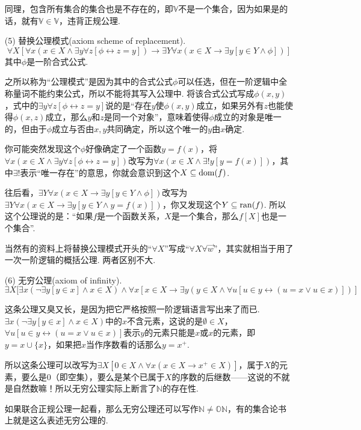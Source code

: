 \documentclass[main.tex]{subfiles}
\begin{document}
\begin{itemize}
\begin{note}
        同理，包含所有集合的集合也是不存在的，即\(\mathbb{V}\)不是一个集合，因为如果是的话，就有\(\mathbb{V}\in\mathbb{V}\)，违背正规公理.
    \end{note}
    
    \item[(5)] 替换公理模式(axiom scheme of replacement).
    \[\forall X [\forall x(x \in X \wedge \exists y \forall z[\phi \leftrightarrow z=y]) \rightarrow \exists Y \forall x(x \in X \rightarrow \exists y[y \in Y \wedge \phi])]\]
    其中\(\phi\)是一阶合式公式.
    \begin{note}
        之所以称为“公理模式”是因为其中的合式公式\(\phi\)可以任选，但在一阶逻辑中全称量词不能约束公式，所以不能将其写入公理中. 将该合式公式写成\(\phi(x,y)\)，式中的\(\exists y \forall z[\phi \leftrightarrow z=y]\)说的是“存在\(y\)使\(\phi(x,y)\)成立，如果另外有\(z\)也能使得\(\phi(x,z)\)成立，那么\(y\)和\(z\)是同一个对象”，意味着使得\(\phi\)成立的对象是唯一的，但由于\(\phi\)成立与否由\(x,y\)共同确定，所以这个唯一的\(y\)由\(x\)确定. 

        你可能突然发现这个\(\phi\)好像确定了一个函数\(y=f(x)\)，将\(\forall x(x \in X \wedge \exists y \forall z[\phi \leftrightarrow z=y])\)改写为\(\forall x(x \in X \wedge \exists! y [y=f(x)])\)，其中\(\exists!\)表示“唯一存在”的意思，你就会意识到这个\(X \subseteq {\rm dom}(f)\).
        
        往后看，\(\exists Y \forall x(x \in X \rightarrow \exists y[y \in Y \wedge \phi])\)改写为\(\exists Y \forall x(x \in X \rightarrow \exists y[y \in Y \wedge y=f(x)])\)，你又发现这个\(Y\subseteq {\rm ran}(f)\). 所以这个公理说的是：“如果\(f\)是一个函数关系，\(X\)是一个集合，那么\(f[X]\)也是一个集合”.

        当然有的资料上将替换公理模式开头的“\(\forall X\)”写成“\(\forall X \forall \vec{w}\)”，其实就相当于用了一次一阶逻辑的概括公理. 两者区别不大.
    \end{note}

    \item[(6)] 无穷公理(axiom of infinity).
    \[\exists X[ \exists x(\neg \exists y[y \in x] \wedge x \in X) \wedge \forall x[x \in X \rightarrow \exists y (y \in X \wedge \forall u[u \in y \leftrightarrow (u=x \vee u \in x)])]\]
    \begin{note}
        这条公理又臭又长，是因为把它严格按照一阶逻辑语言写出来了而已. \(\exists x(\neg \exists y[y \in x] \wedge x \in X)\)中的\(x\)不含元素，这说的是\(\emptyset \in X\)，\(\forall u[u \in y \leftrightarrow (u=x \vee u \in x)]\)表示\(y\)的元素只能是\(x\)或\(x\)的元素，即\(y=x \cup \{x\}\)，如果把\(x\)当作序数看的话那么\(y=x^+\).

        所以这条公理可以改写为\(\exists X[0 \in X \wedge \forall x(x \in X \rightarrow x^+ \in X)]\)，属于\(X\)的元素，要么是0（即空集），要么是某个已属于\(X\)的序数的后继数——这说的不就是自然数嘛！所以无穷公理实际上断言了\(\mathbb{N}\)的存在性.

        如果联合正规公理一起看，那么无穷公理还可以写作\(\mathbb{N} \neq \mathbb{ON}\)，有的集合论书上就是这么表述无穷公理的.
    \end{note}
\end{itemize}
\end{document}
